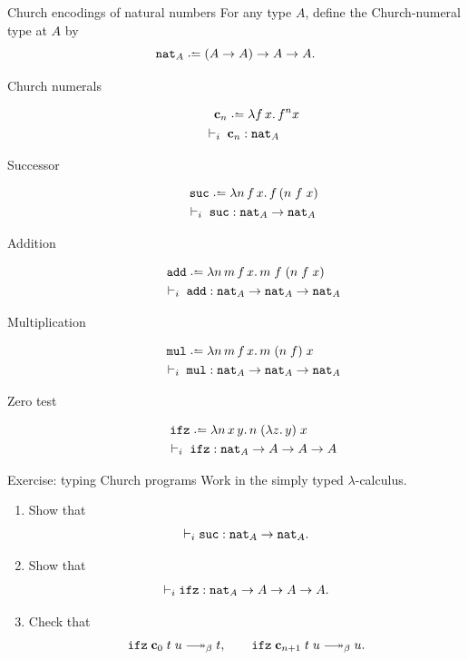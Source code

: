 \begin{frame}[allowframebreaks]{Church encodings of natural numbers}
  For any type $A$, define the Church-numeral type at $A$ by
  \[
    \nat_A \defeq (A \to A) \to A \to A.
  \]

  \begin{description}
    \item[Church numerals]
      \begin{align*}
        \bc_n &\defeq \lambda f\,x.\,f^n x \\
        \vdash_i{}\; &\bc_n : \nat_A
      \end{align*}

    \item[Successor]
      \begin{align*}
        \suc &\defeq \lambda n\,f\,x.\,f\,(n\;f\;x) \\
        \vdash_i{}\; &\suc : \nat_A \to \nat_A
      \end{align*}

    \item[Addition]
      \begin{align*}
        \add &\defeq \lambda n\,m\,f\,x.\,m\;f\;(n\;f\;x) \\
        \vdash_i{}\; &\add : \nat_A \to \nat_A \to \nat_A
      \end{align*}

    \item[Multiplication]
      \begin{align*}
        \mul &\defeq \lambda n\,m\,f\,x.\,m\;(n\;f)\;x \\
        \vdash_i{}\; &\mul : \nat_A \to \nat_A \to \nat_A
      \end{align*}

    \item[Zero test]
      \begin{align*}
        \ifz &\defeq \lambda n\,x\,y.\,n\;(\lambda z.\,y)\;x \\
        \vdash_i{}\; &\ifz : \nat_A \to A \to A \to A
      \end{align*}
  \end{description}
\end{frame}

\begin{frame}{Exercise: typing Church programs}
  Work in the simply typed $\lambda$-calculus.

  \begin{enumerate}
    \item Show that
      \[
        \vdash_i \mathtt{suc} : \mathtt{nat}_A \to \mathtt{nat}_A.
      \]

    \item Show that
      \[
        \vdash_i \mathtt{ifz} : \mathtt{nat}_A \to A \to A \to A.
      \]

    \item Check that
      \[
        \ifz\;\bc_0\;t\;u \reduce t,
        \qquad
        \ifz\;\bc_{n+1}\;t\;u \reduce u.
      \]
  \end{enumerate}
\end{frame}

